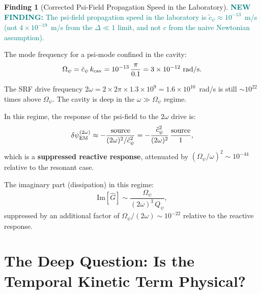 \documentclass[11pt]{article}
\newcommand{\Qpsi}{Q_\psi}
\newcommand{\ee}[1]{\times 10^{#1}}
\newcommand{\Opsi}{\Omega_\psi}
\newcommand{\dpsiEM}{\delta\psi_{\rm EM}}
\newcommand{\newfinding}[1]{\textcolor{teal}{\textbf{NEW FINDING:} #1}}
\theoremstyle{definition}
\newtheorem{finding}[theorem]{Finding}
\theoremstyle{remark}
\begin{document}
\begin{finding}[Corrected Psi-Field Propagation Speed in the Laboratory]
\label{find:cpsi-corrected}
\newfinding{The psi-field propagation speed in the laboratory is
$\tilde{c}_\psi \approx 10^{-13}$~m/s (not $4\ee{-19}$~m/s from
the $\Delta \ll 1$ limit, and not $c$ from the naive Newtonian
assumption).}

The mode frequency for a psi-mode confined in the cavity:
\begin{equation}
\Opsi = \tilde{c}_\psi\,k_{\rm cav}
= 10^{-13}\,\frac{\pi}{0.1}
= 3\ee{-12}~\text{rad/s}.
\end{equation}

The SRF drive frequency $2\omega = 2\times 2\pi\times 1.3\ee{9}
= 1.6\ee{10}$~rad/s is still $\sim 10^{22}$ times above $\Opsi$.
The cavity is deep in the $\omega \gg \Opsi$ regime.

In this regime, the response of the psi-field to the $2\omega$
drive is:
\begin{equation}
\dpsiEM^{(2\omega)} \approx -\frac{\text{source}}{(2\omega)^2
/\tilde{c}_\psi^2} = -\frac{\tilde{c}_\psi^2}{(2\omega)^2}\,
\frac{\text{source}}{1},
\end{equation}
which is a \textbf{suppressed reactive response}, attenuated by
$(\Opsi/\omega)^2 \sim 10^{-44}$ relative to the resonant case.

The imaginary part (dissipation) in this regime:
\begin{equation}
\text{Im}[\hat{G}] \sim \frac{\Opsi}{(2\omega)^3\,\Qpsi},
\end{equation}
suppressed by an additional factor of $\Opsi/(2\omega) \sim 10^{-22}$
relative to the reactive response.
\end{finding}


\section{The Deep Question: Is the Temporal Kinetic Term Physical?}
\label{sec:deep-question}
\end{document}
